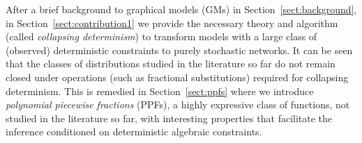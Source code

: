 \documentclass[]{article}
\begin{document}
After a brief background to %
graphical models (GMs) in Section~\ref{sect:background}, 
in Section~\ref{sect:contribution1} we provide the necessary theory and algorithm (called \emph{collapsing determinism}) 
to transform models with a large class of (observed) deterministic constraints to purely stochastic networks. %
It can be seen that the classes of distributions studied in the literature so far do not remain closed under operations (such as fractional substitutions) required for collapsing determinism.
This is remedied in 
Section~\ref{sect:ppfs} where we 
introduce \emph{polynomial piecewise fractions} (PPFs), a highly expressive class of functions, not studied in the literature so far, 
with interesting properties that facilitate the inference conditioned on deterministic algebraic constraints.


\end{document}
